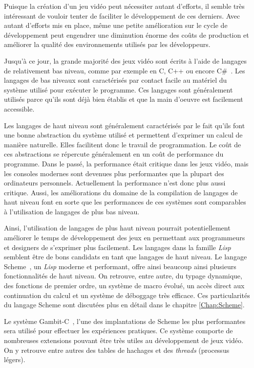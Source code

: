 \documentclass[12pt,oneside,letterpaper,francais]{book}
\newcommand{\lisp}{{\textit{Lisp }}}
\begin{document}
Puisque la création d'un jeu vidéo peut nécessiter autant d'efforts,
il semble très intéressant de vouloir tenter de faciliter le
développement de ces derniers. Avec autant d'efforts mis en place,
même une petite amélioration sur le cycle de développement peut
engendrer une diminution énorme des coûts de production et améliorer
la qualité des environnements utilisés par les développeurs.

Jusqu'à ce jour, la grande majorité des jeux vidéo sont écrits à
l'aide de langages de relativement bas niveau, comme par exemple en C,
C++ ou encore C\#~\cite{CSHARP_SPEC}. Les langages de bas niveaux sont
caractérisés par contact facile au matériel du système utilisé pour
exécuter le programme. Ces langages sont généralement utilisés parce
qu'ils sont déjà bien établis et que la main d'oeuvre est facilement
accessible.

Les langages de haut niveau sont généralement caractérisés par le fait
qu'ils font une bonne abstraction du système utilisé et permettent
d'exprimer un calcul de manière naturelle. Elles facilitent donc le
travail de programmation. Le coût de ces abstractions se répercute
généralement en un coût de performance du programme. Dans le passé, la
performance était critique dans les jeux vidéo, mais les consoles
modernes sont devenues plus performantes que la plupart des
ordinateurs personnels. Actuellement la performance n'est donc plus
aussi critique. Aussi, les améliorations du domaine de la compilation
de langages de haut niveau font en sorte que les performances de ces
systèmes sont comparables à l'utilisation de langages de plus bas
niveau.

Ainsi, l'utilisation de langages de plus haut niveau pourrait
potentiellement améliorer le temps de développement des jeux en
permettant aux programmeurs et designers de s'exprimer plus
facilement. Les langages dans la famille \lisp semblent être de bons
candidats en tant que langages de haut niveau. Le langage
Scheme~\cite{R5RS}, un \lisp moderne et performant, offre ainsi
beaucoup ainsi plusieurs fonctionnalités de haut niveau. On retrouve,
entre autre, du typage dynamique, des fonctions de premier ordre, un
système de macro évolué, un accès direct aux continuation du calcul et
un système de déboggage très efficace. Ces particularités du langage
Scheme sont discutées plus en détail dans le chapitre
\ref{Chap:Scheme}.

Le système Gambit-C~\cite{Gambit4}, l'une des implantations de Scheme
les plus performantes~\cite{GAMBIT_BENCHMARKS} sera utilisé pour
effectuer les expériences pratiques. Ce système comporte de nombreuses
extensions pouvant être très utiles au développement de jeux vidéo. On
y retrouve entre autres des tables de hachages et des \textit{threads}
(processus légers).
\end{document}
